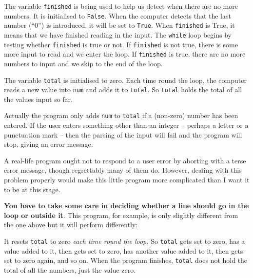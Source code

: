 The variable
\texttt{finished} is being used to help us detect when there are no more
numbers. It is initialised to \texttt{False}.  When the computer detects
that the last number (``0'') is introduced, it will be set to \texttt{True}.
When \texttt{finished} is True, it means that we have finished reading in
the input. The \texttt{while} loop begins by testing whether \texttt{finished}
is true or not.  If \texttt{finished} is not true, there is some more input
to read and we enter the loop. If \texttt{finished} is true, there are
no more numbers to input and we skip to the end of the loop.

The variable \texttt{total} is initialised to zero.
Each time round the loop, the computer reads a new value into \texttt{num}
and adds it to \texttt{total}. So \texttt{total} holds the total of all
the values input so far.

Actually the program only adds  \texttt{num} to \texttt{total} if a (non-zero) 
number has been entered. 
If the user enters something other than an integer 
-- perhaps a letter or a punctuation mark -- 
then the parsing of the input will fail 
and the program will stop, giving an error message.

A real-life program ought not to respond to a user error by aborting
with a terse error message, though regrettably many of them do.
However, dealing with this problem properly would make this little program
more complicated than I want it to be at this stage.

\pagebreak

\textbf{You have to take some care in deciding whether a line should go in the
loop or outside it}.  This program, for example, is only slightly different
from the one above but it will perform differently:


It resets \texttt{total} to zero \emph{each time round the loop.}  So
\texttt{total} gets set to zero,
has a value added to it, then gets set to zero, has another value added to
it, then gets set to zero again, and so on.  When the program finishes,
\texttt{total} does not hold the total of all the numbers, just the value
zero.

